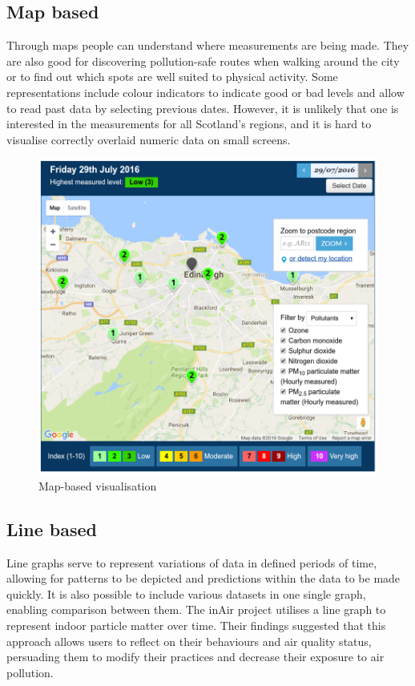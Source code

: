 \subsection{Map based}
Through maps people can understand where measurements are being made. They are also good for discovering pollution-safe routes when walking around the city or to find out which spots are well suited to physical activity.  Some representations include colour indicators to indicate good or bad levels and allow to read past data by selecting previous dates. However, it is unlikely that one is interested in the measurements for all Scotland's regions, and it is hard to visualise correctly overlaid numeric data on small screens.

\begin{figure}[H]
\begin{adjustbox}{width=1\textwidth,center=\textwidth}
  \centering
  \includegraphics[scale=.30]{images/map_visualization.png}
\end{adjustbox}
  \caption[Map-based visualisation]{Map-based visualisation \cite{Scottishairquality.co.uk2016}}
  \label{fig:web_based_desktop_visualization}
\end{figure}


\subsection{Line based}
Line graphs serve to represent variations of data in defined periods of time, allowing for patterns to be depicted and predictions within the data to be made quickly. It is also possible to include various datasets in one single graph, enabling comparison between them. The inAir project \cite{Kim2013} utilises a line graph to represent indoor particle matter over time. Their findings suggested that this approach allows users to reflect on their behaviours and air quality status, persuading them to modify their practices and decrease their exposure to air pollution. 

